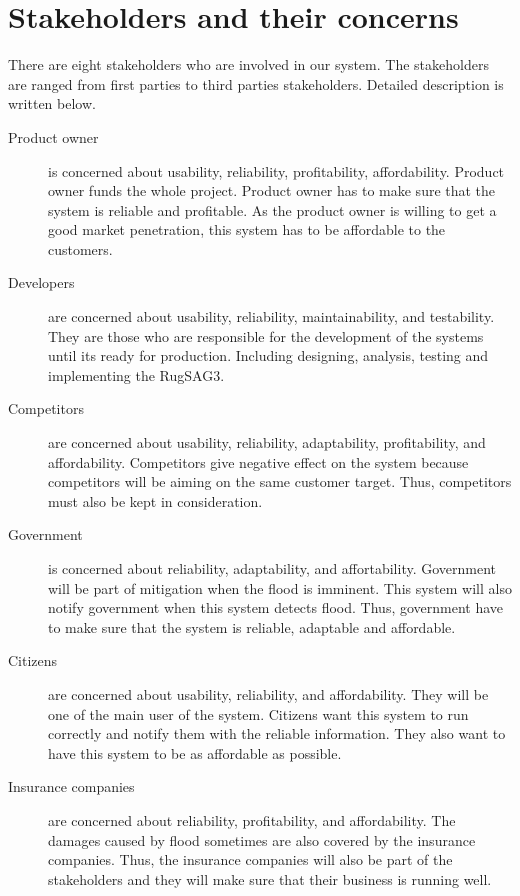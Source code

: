 \section{Stakeholders and their concerns}


There are eight stakeholders who are involved in our system. The stakeholders are ranged from first parties to third parties stakeholders. Detailed description is written below.

\begin{description}
\item[Product owner] is concerned about usability, reliability, profitability, affordability. Product owner funds the whole project. Product owner has to make sure that the system is reliable and profitable. As the product owner is willing to get a good market penetration, this system has to be affordable to the customers.
\item[Developers] are concerned about usability, reliability, maintainability, and testability. They are those who are responsible for the development of the systems until its ready for production. Including designing, analysis, testing and implementing the RugSAG3.
\item[Competitors] are concerned about usability, reliability, adaptability, profitability, and affordability. Competitors give negative effect on the system because competitors will be aiming on the same customer target. Thus, competitors must also be kept in consideration. 
\item[Government] is concerned about reliability, adaptability, and affortability. Government will be part of mitigation when the flood is imminent. This system will also notify government when this system detects flood. Thus, government have to make sure that the system is reliable, adaptable and affordable.
\item[Citizens] are concerned about usability, reliability, and affordability. They will be one of the main user of the system. Citizens want this system to run correctly and notify them with the reliable information. They also want to have this system to be as affordable as possible.
\item[Insurance companies] are concerned about reliability, profitability, and affordability. The damages caused by flood sometimes are also covered by the insurance companies. Thus, the insurance companies will also be part of the stakeholders and they will make sure that their business is running well.

\end{description}
